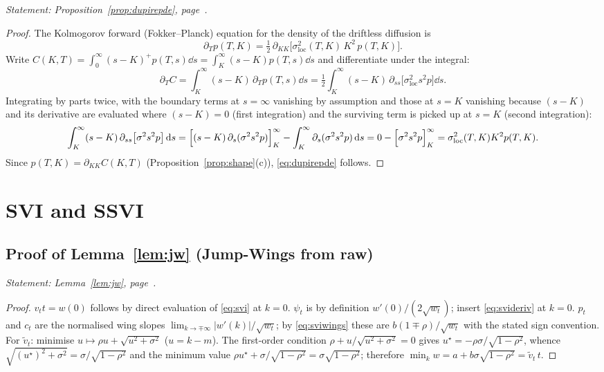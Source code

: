 \noindent\emph{Statement: Proposition~\ref{prop:dupirepde}, page~\pageref{prop:dupirepde}.}\medskip

\begin{proof}
The Kolmogorov forward (Fokker--Planck) equation for the density of the driftless diffusion is
\[
\partial_T p(T,K)=\tfrac12\,\partial_{KK}\bigl[\sigma_{\mathrm{loc}}^2(T,K)\,K^2\,p(T,K)\bigr].
\]
Write $C(K,T)=\int_0^\infty (s-K)^+p(T,s)\dd s=\int_K^\infty(s-K)p(T,s)\dd s$ and
differentiate under the integral:
\[
\partial_T C=\int_K^\infty(s-K)\,\partial_Tp(T,s)\dd s
=\tfrac12\int_K^\infty(s-K)\,\partial_{ss}\bigl[\sigma_{\mathrm{loc}}^2s^2p\bigr]\dd s.
\]
Integrating by parts twice, with the boundary terms at $s=\infty$ vanishing by assumption and
those at $s=K$ vanishing because $(s-K)$ and its derivative are evaluated where $(s-K)=0$
(first integration) and the surviving term is picked up at $s=K$ (second integration):
\[
\int_K^\infty(s-K)\,\partial_{ss}\bigl[\sigma^2s^2p\bigr]\,\mathrm{d} s
=\Bigl[(s-K)\,\partial_s(\sigma^2s^2p)\Bigr]_K^\infty
-\int_K^\infty\partial_s(\sigma^2s^2p)\,\mathrm{d} s
=0-\Bigl[\sigma^2s^2p\Bigr]_K^\infty
=\sigma_{\mathrm{loc}}^2(T,K)K^2p(T,K).
\]
Since $p(T,K)=\partial_{KK}C(K,T)$ (Proposition~\ref{prop:shape}(c)), \eqref{eq:dupirepde}
follows.
\end{proof}

\section{SVI and SSVI}\label{app:proofs:svi}

\subsection{Proof of Lemma~\ref{lem:jw} (Jump-Wings from raw)}
\label{proof:jw}

\noindent\emph{Statement: Lemma~\ref{lem:jw}, page~\pageref{lem:jw}.}\medskip

\begin{proof}
$v_t t=w(0)$ follows by direct evaluation of \eqref{eq:svi} at $k=0$. $\psi_t$ is by
definition $w'(0)/(2\sqrt{w_t})$; insert \eqref{eq:svideriv} at $k=0$. $p_t$ and $c_t$ are the
normalised wing slopes $\lim_{k\to\mp\infty}|w'(k)|/\sqrt{w_t}$; by \eqref{eq:sviwings} these
are $b(1\mp\rho)/\sqrt{w_t}$ with the stated sign convention. For $\tilde v_t$: minimise
$u\mapsto\rho u+\sqrt{u^2+\sigma^2}$ ($u=k-m$). The first-order condition
$\rho+u/\sqrt{u^2+\sigma^2}=0$ gives $u^\star=-\rho\sigma/\sqrt{1-\rho^2}$, whence
$\sqrt{(u^\star)^2+\sigma^2}=\sigma/\sqrt{1-\rho^2}$ and the minimum value
$\rho u^\star+\sigma/\sqrt{1-\rho^2}=\sigma\sqrt{1-\rho^2}$; therefore
$\min_kw=a+b\sigma\sqrt{1-\rho^2}=\tilde v_t\,t$.
\end{proof}

